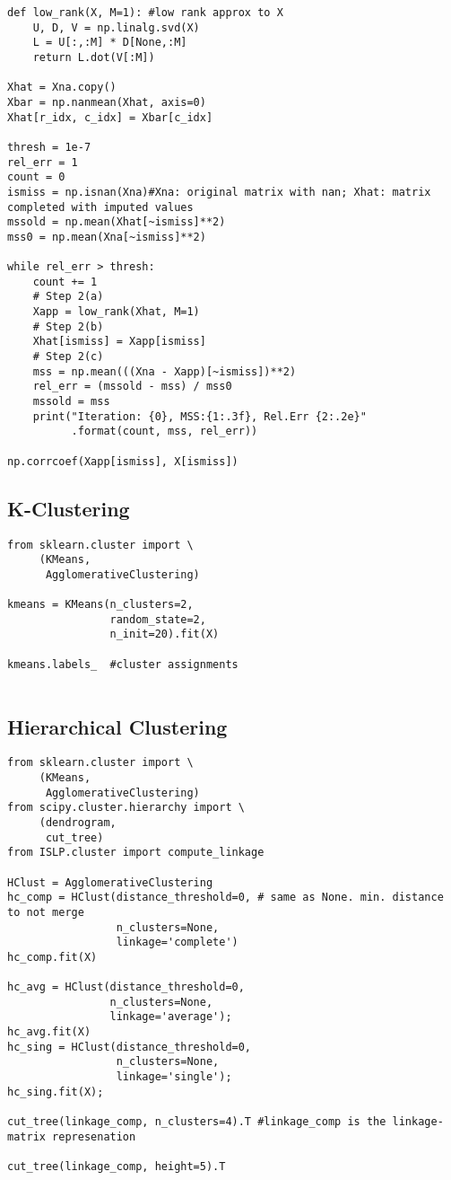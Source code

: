 \documentclass[
  letterpaper,
  DIV=11,
  numbers=noendperiod]{scrreprt}
\begin{document}
\begin{verbatim}
def low_rank(X, M=1): #low rank approx to X
    U, D, V = np.linalg.svd(X)
    L = U[:,:M] * D[None,:M]
    return L.dot(V[:M])
    
Xhat = Xna.copy()
Xbar = np.nanmean(Xhat, axis=0) 
Xhat[r_idx, c_idx] = Xbar[c_idx]

thresh = 1e-7
rel_err = 1
count = 0
ismiss = np.isnan(Xna)#Xna: original matrix with nan; Xhat: matrix completed with imputed values
mssold = np.mean(Xhat[~ismiss]**2)
mss0 = np.mean(Xna[~ismiss]**2)

while rel_err > thresh:
    count += 1
    # Step 2(a)
    Xapp = low_rank(Xhat, M=1)
    # Step 2(b)
    Xhat[ismiss] = Xapp[ismiss]
    # Step 2(c)
    mss = np.mean(((Xna - Xapp)[~ismiss])**2)
    rel_err = (mssold - mss) / mss0
    mssold = mss
    print("Iteration: {0}, MSS:{1:.3f}, Rel.Err {2:.2e}"
          .format(count, mss, rel_err))
          
np.corrcoef(Xapp[ismiss], X[ismiss])
\end{verbatim}

\subsection{K-Clustering}\label{k-clustering}

\begin{verbatim}
from sklearn.cluster import \
     (KMeans,
      AgglomerativeClustering)
      
kmeans = KMeans(n_clusters=2,
                random_state=2,
                n_init=20).fit(X)
                
kmeans.labels_  #cluster assignments                
                
\end{verbatim}

\subsection{Hierarchical Clustering}\label{hierarchical-clustering-1}

\begin{verbatim}
from sklearn.cluster import \
     (KMeans,
      AgglomerativeClustering)
from scipy.cluster.hierarchy import \
     (dendrogram,
      cut_tree)
from ISLP.cluster import compute_linkage

HClust = AgglomerativeClustering
hc_comp = HClust(distance_threshold=0, # same as None. min. distance to not merge
                 n_clusters=None,
                 linkage='complete')
hc_comp.fit(X)

hc_avg = HClust(distance_threshold=0,
                n_clusters=None,
                linkage='average');
hc_avg.fit(X)
hc_sing = HClust(distance_threshold=0,
                 n_clusters=None,
                 linkage='single');
hc_sing.fit(X);

cut_tree(linkage_comp, n_clusters=4).T #linkage_comp is the linkage-matrix represenation

cut_tree(linkage_comp, height=5).T
\end{verbatim}
\end{document}
